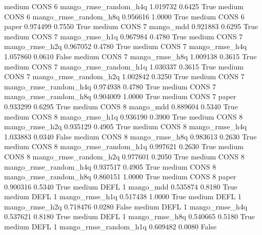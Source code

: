     medium     CONS                 6 mango_rmse_random_h4q   1.019732      0.6425    True
    medium     CONS                 6 mango_rmse_random_h8q   0.956616      1.0000    True
    medium     CONS                 6                 paper   0.974499      0.7550    True
    medium     CONS                 7             mango_mdd   0.921883      0.6295    True
    medium     CONS                 7        mango_rmse_h1q   0.967984      0.4780    True
    medium     CONS                 7        mango_rmse_h2q   0.967052      0.4780    True
    medium     CONS                 7        mango_rmse_h4q   1.057860      0.0610   False
    medium     CONS                 7        mango_rmse_h8q   1.009138      0.3615    True
    medium     CONS                 7 mango_rmse_random_h1q   1.030337      0.3615    True
    medium     CONS                 7 mango_rmse_random_h2q   1.002842      0.3250    True
    medium     CONS                 7 mango_rmse_random_h4q   0.974938      0.4780    True
    medium     CONS                 7 mango_rmse_random_h8q   0.904009      1.0000    True
    medium     CONS                 7                 paper   0.933299      0.6295    True
    medium     CONS                 8             mango_mdd   0.889604      0.5340    True
    medium     CONS                 8        mango_rmse_h1q   0.936190      0.3900    True
    medium     CONS                 8        mango_rmse_h2q   0.935129      0.4905    True
    medium     CONS                 8        mango_rmse_h4q   1.033883      0.0340   False
    medium     CONS                 8        mango_rmse_h8q   0.983613      0.2630    True
    medium     CONS                 8 mango_rmse_random_h1q   0.997621      0.2630    True
    medium     CONS                 8 mango_rmse_random_h2q   0.977601      0.2050    True
    medium     CONS                 8 mango_rmse_random_h4q   0.937517      0.4905    True
    medium     CONS                 8 mango_rmse_random_h8q   0.860151      1.0000    True
    medium     CONS                 8                 paper   0.900316      0.5340    True
    medium     DEFL                 1             mango_mdd   0.535874      0.8180    True
    medium     DEFL                 1        mango_rmse_h1q   0.517438      1.0000    True
    medium     DEFL                 1        mango_rmse_h2q   0.718476      0.0280   False
    medium     DEFL                 1        mango_rmse_h4q   0.537621      0.8180    True
    medium     DEFL                 1        mango_rmse_h8q   0.540665      0.5180    True
    medium     DEFL                 1 mango_rmse_random_h1q   0.609482      0.0080   False

